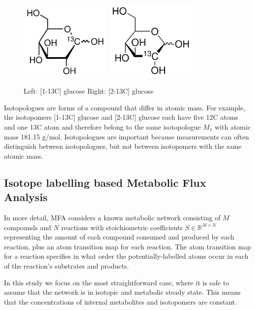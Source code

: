 \documentclass{article}
\begin{document}
\begin{figure}[!h]
\centering
\includegraphics[width=0.4\textwidth, height=!]{img/1-13C-glucose.png}
\includegraphics[width=0.4\textwidth, height=!]{img/2-13C-glucose.png}
\caption{Left: [1-13C] glucose Right: [2-13C] glucose}
\label{glucose}
\end{figure}

Isotopologues are forms of a compound that differ in atomic mass. For
example, the isotopomers {[}1-13C{]} glucose and {[}2-13C{]} glucose
each have five 12C atoms and one 13C atom and therefore belong to the
same isotopologue \(M_1\) with atomic mass 181.15 g/mol. Isotopologues
are important because measurements can often distinguish between
isotopologues, but not between isotopomers with the same atomic mass.

\subsection{Isotope labelling based Metabolic Flux
Analysis}\label{isotope-labelling-based-metabolic-flux-analysis}

In more detail, MFA considers a known metabolic network consisting of
\(M\) compounds and \(N\) reactions with stoichiometric coefficients
\(S\in\mathbb{R}^{M\times N}\) representing the amount of each compound
consumed and produced by each reaction, plus an atom transition map for
each reaction. The atom transition map for a reaction specifies in what
order the potentially-labelled atoms occur in each of the reaction's
substrates and products.

In this study we focus on the most straightforward case, where it is
safe to assume that the network is in isotopic and metabolic steady
state. This means that the concentrations of internal metabolites and
isotopomers are constant.
\end{document}
